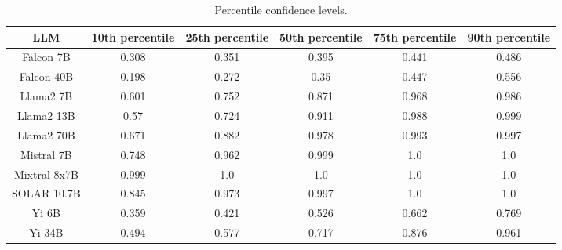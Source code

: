 \begin{table*}
\centering
\begin{tabular}{c|c|c|c|c|c}
LLM & 10th percentile & 25th percentile & 50th percentile & 75th percentile & 90th percentile\\ \hline
Falcon 7B & 0.308 & 0.351 & 0.395 & 0.441 & 0.486\\
Falcon 40B & 0.198 & 0.272 & 0.35 & 0.447 & 0.556\\
Llama2 7B & 0.601 & 0.752 & 0.871 & 0.968 & 0.986\\
Llama2 13B & 0.57 & 0.724 & 0.911 & 0.988 & 0.999\\
Llama2 70B & 0.671 & 0.882 & 0.978 & 0.993 & 0.997\\
Mistral 7B & 0.748 & 0.962 & 0.999 & 1.0 & 1.0\\
Mixtral 8x7B & 0.999 & 1.0 & 1.0 & 1.0 & 1.0\\
SOLAR 10.7B & 0.845 & 0.973 & 0.997 & 1.0 & 1.0\\
Yi 6B & 0.359 & 0.421 & 0.526 & 0.662 & 0.769\\
Yi 34B & 0.494 & 0.577 & 0.717 & 0.876 & 0.961\\
\hline
\end{tabular}
\caption{Percentile confidence levels.}
\label{tab:percentile_conf}
\end{table*}
